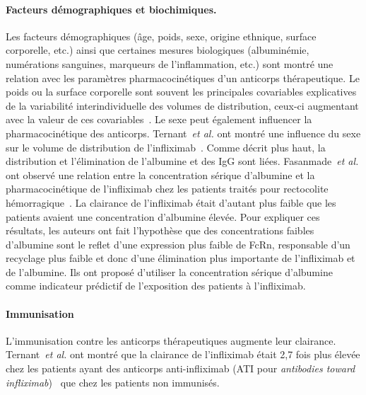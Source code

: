 \paragraph{Facteurs démographiques et biochimiques.} Les facteurs démographiques (âge, poids, sexe, origine ethnique, surface corporelle, etc.) ainsi que certaines mesures biologiques (albuminémie, numérations sanguines, marqueurs de l'inflammation, etc.) sont montré une relation avec les paramètres pharmacocinétiques d'un anticorps thérapeutique. Le poids ou la surface corporelle sont souvent les principales covariables explicatives de la variabilité interindividuelle des volumes de distribution, ceux-ci augmentant avec la valeur de ces covariables~\citep{REF52, REF61, REF74, REF76, REF78, REF79, REF80}. Le sexe peut également influencer la pharmacocinétique des anticorps. Ternant~\textit{et al.} ont montré une influence du sexe sur le volume de distribution de l'infliximab~\citep{REF71}. 
Comme décrit plus haut, la distribution et l'élimination de l'albumine et des IgG sont liées. Fasanmade~\textit{et al.} ont observé une relation entre la concentration sérique d'albumine et la pharmacocinétique de l'infliximab chez les patients traités pour rectocolite hémorragique~\citep{REF81}. La clairance de l'infliximab était d'autant plus faible que les patients avaient une concentration d'albumine élevée. Pour expliquer ces résultats, les auteurs ont fait l'hypothèse que des concentrations faibles d'albumine sont le reflet d'une expression plus faible de FcRn, responsable d'un recyclage plus faible et donc d'une élimination plus importante de l'infliximab et de l'albumine. Ils ont proposé d'utiliser la concentration sérique d'albumine comme indicateur prédictif de l'exposition des patients à l'infliximab.
\paragraph{Immunisation}
L'immunisation contre les anticorps thérapeutiques augmente leur clairance. Ternant~\textit{et al.} ont montré que la clairance de l'infliximab était 2,7 fois plus élevée chez les patients ayant des anticorps anti-infliximab (ATI pour \textit{antibodies toward infliximab})~\citep{REF71} que chez les patients non immunisés.

